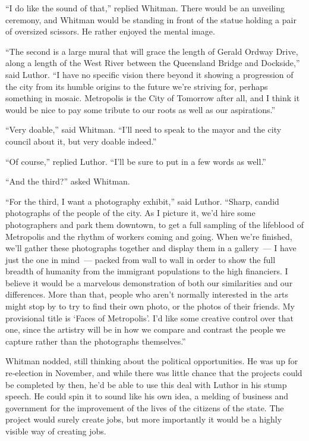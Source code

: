 ``I do like the sound of that,'' replied Whitman. There would be an
unveiling ceremony, and Whitman would be standing in front of the statue
holding a pair of oversized scissors. He rather enjoyed the mental
image.

``The second is a large mural that will grace the length of Gerald
Ordway Drive, along a length of the West River between the Queensland
Bridge and Dockside,'' said Luthor. ``I have no specific vision there
beyond it showing a progression of the city from its humble origins to
the future we're striving for, perhaps something in mosaic. Metropolis
is the City of Tomorrow after all, and I think it would be nice to pay
some tribute to our roots as well as our aspirations.''

``Very doable,'' said Whitman. ``I'll need to speak to the mayor and the
city council about it, but very doable indeed.''

``Of course,'' replied Luthor. ``I'll be sure to put in a few words as
well.''

``And the third?'' asked Whitman.

``For the third, I want a photography exhibit,'' said Luthor. ``Sharp,
candid photographs of the people of the city. As I picture it, we'd hire
some photographers and park them downtown, to get a full sampling of the
lifeblood of Metropolis and the rhythm of workers coming and going. When
we're finished, we'll gather these photographs together and display them
in a gallery~--- I have just the one in mind~--- packed from wall to
wall in order to show the full breadth of humanity from the immigrant
populations to the high financiers. I believe it would be a marvelous
demonstration of both our similarities and our differences. More than
that, people who aren't normally interested in the arts might stop by to
try to find their own photo, or the photos of their friends. My
provisional title is `Faces of Metropolis'. I'd like some creative
control over that one, since the artistry will be in how we compare and
contrast the people we capture rather than the photographs themselves.''

Whitman nodded, still thinking about the political opportunities. He was
up for re‐election in November, and while there was little chance that
the projects could be completed by then, he'd be able to use this deal
with Luthor in his stump speech. He could spin it to sound like his own
idea, a melding of business and government for the improvement of the
lives of the citizens of the state. The project would surely create
jobs, but more importantly it would be a highly visible way of creating
jobs.

